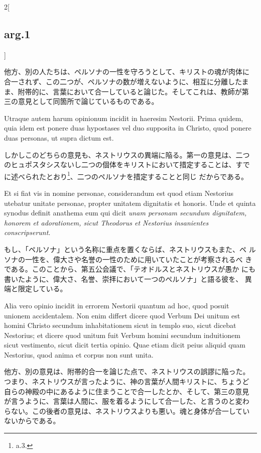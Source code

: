 \documentclass[paper=a4paper,fontsize=10pt,jafontsize=9pt,titlepage]{jlreq}
\begin{document}
\begin{paracol}{2}[\subsection{arg.1}]
\switchcolumn

他方、別の人たちは、ペルソナの一性を守ろうとして、キリストの魂が肉体に
合一されず、この二つが、ペルソナの数が増えないように、相互に分離したま
ま、附帯的に、言葉において合一していると論じた。そしてこれは、教師が第
三の意見として同箇所で論じているものである。

\switchcolumn*

Utraque autem harum opinionum incidit in haeresim Nestorii. Prima
quidem, quia idem est ponere duas hypostases vel duo supposita in
Christo, quod ponere duas personas, ut supra dictum est.

\switchcolumn

しかしこのどちらの意見も、ネストリウスの異端に陥る。第一の意見は、二つ
のヒュポスタシスないし二つの個体をキリストにおいて措定することは、すで
に述べられたとおり\footnote{a.3.}、二つのペルソナを措定することと同じ
だからである。

\switchcolumn*

Et si fiat vis in nomine personae, considerandum est quod etiam
Nestorius utebatur unitate personae, propter unitatem dignitatis et
honoris. Unde et quinta synodus definit anathema eum qui dicit
{\itshape unam personam secundum dignitatem, honorem et adorationem,
sicut Theodorus et Nestorius insanientes conscripserunt}.

\switchcolumn

もし、「ペルソナ」という名称に重点を置くならば、ネストリウスもまた、ペ
ルソナの一性を、偉大さや名誉の一性のために用いていたことが考察されるべ
きである。このことから、第五公会議で、「テオドルスとネストリウスが愚か
にも書いたように、偉大さ、名誉、崇拝において一つのペルソナ」と語る彼を、
異端と限定している。

\switchcolumn*

Alia vero opinio incidit in errorem Nestorii quantum ad hoc, quod
posuit unionem accidentalem. Non enim differt dicere quod Verbum Dei
unitum est homini Christo secundum inhabitationem sicut in templo suo,
sicut dicebat Nestorius; et dicere quod unitum fuit Verbum homini
secundum induitionem sicut vestimento, sicut dicit tertia opinio.
Quae etiam dicit peius aliquid quam Nestorius, quod anima et corpus
non sunt unita.

\switchcolumn

他方、別の意見は、附帯的合一を論じた点で、ネストリウスの誤謬に陥った。
つまり、ネストリウスが言ったように、神の言葉が人間キリストに、ちょうど
自らの神殿の中にあるように住まうことで合一したとか、そして、第三の意見
が言うように、言葉は人間に、服を着るようにして合一した、と言うのと変わ
らない。この後者の意見は、ネストリウスよりも悪い。魂と身体が合一してい
ないからである。


\end{paracol}
\end{document}
